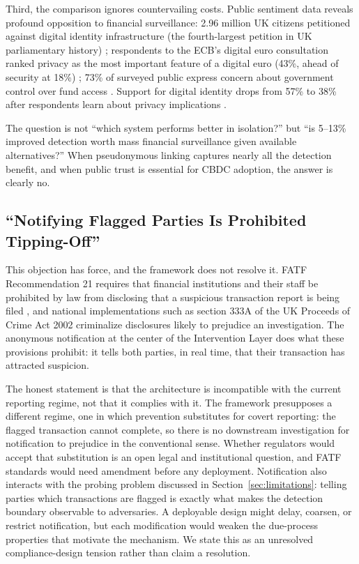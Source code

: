 \documentclass[11pt]{article}
\begin{document}
Third, the comparison ignores countervailing costs. Public sentiment data reveals profound opposition to financial surveillance: 2.96 million UK citizens petitioned against digital identity infrastructure (the fourth-largest petition in UK parliamentary history) \citep{Statewatch2025}; respondents to the ECB's digital euro consultation ranked privacy as the most important feature of a digital euro (43\%, ahead of security at 18\%) \citep{ECBConsultation2021}; 73\% of surveyed public express concern about government control over fund access \citep{OxfordCBDCSurvey2025}. Support for digital identity drops from 57\% to 38\% after respondents learn about privacy implications \citep{Ipsos2025}.

The question is not ``which system performs better in isolation?'' but ``is 5--13\% improved detection worth mass financial surveillance given available alternatives?'' When pseudonymous linking captures nearly all the detection benefit, and when public trust is essential for CBDC adoption, the answer is clearly no.

\subsection{``Notifying Flagged Parties Is Prohibited Tipping-Off''}
\label{sec:tipping-off}

This objection has force, and the framework does not resolve it. FATF Recommendation 21 requires that financial institutions and their staff be prohibited by law from disclosing that a suspicious transaction report is being filed \citep{FATF2012}, and national implementations such as section 333A of the UK Proceeds of Crime Act 2002 criminalize disclosures likely to prejudice an investigation. The anonymous notification at the center of the Intervention Layer does what these provisions prohibit: it tells both parties, in real time, that their transaction has attracted suspicion.

The honest statement is that the architecture is incompatible with the current reporting regime, not that it complies with it. The framework presupposes a different regime, one in which prevention substitutes for covert reporting: the flagged transaction cannot complete, so there is no downstream investigation for notification to prejudice in the conventional sense. Whether regulators would accept that substitution is an open legal and institutional question, and FATF standards would need amendment before any deployment. Notification also interacts with the probing problem discussed in Section~\ref{sec:limitations}: telling parties which transactions are flagged is exactly what makes the detection boundary observable to adversaries. A deployable design might delay, coarsen, or restrict notification, but each modification would weaken the due-process properties that motivate the mechanism. We state this as an unresolved compliance-design tension rather than claim a resolution.
\end{document}
